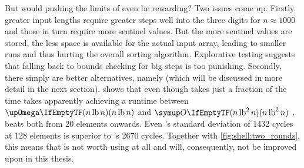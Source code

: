 But would pushing the limits of \ShS{} even be rewarding?
Two issues come up.
Firstly, greater input lengths require greater steps \Dash well into the three digits for \(n \approx 1000\) \cite{skean2023optimization, 10.1007/3-540-44669-9_12} \Dash and those in turn require more sentinel values.
But the more sentinel values are stored, the less space is available for the actual input array, leading to smaller runs and thus hurting the overall sorting algorithm.
Explorative testing suggests that falling back to bounds checking for big steps is too punishing.
Secondly, there simply are better alternatives, namely \QS{} (which will be discussed in more detail in the next section).
 shows that even though \ShS{} takes just a fraction of the time \IS{} takes \Dash apparently achieving a runtime between \(\bigomega{n \lb n}\) and \(\bigoh{n \lb^2 n}\) \Dash\negthinspace, \QS{} beats both from 20 elements onwards.
Even \QS{}'s standard deviation of 1432 cycles at 128 elements is superior to \ShS{}'s 2670 cycles.
Together with \cref{fig:shell:two_rounds}, this means that \ShS{} is not worth using at all and will, consequently, not be improved upon in this thesis.
